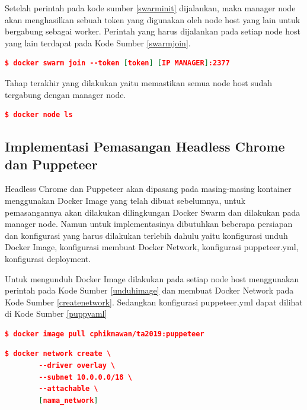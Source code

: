 			Setelah perintah pada kode sumber \ref{swarminit} dijalankan, maka manager node akan menghasilkan sebuah token yang digunakan oleh node host yang lain untuk bergabung sebagai worker. Perintah yang harus dijalankan pada setiap node host yang lain terdapat pada Kode Sumber \ref{swarmjoin}.
			\begin{lstlisting}[frame=single,tabsize=2,breaklines,caption={Perintah untuk bergabung ke Swarm},label=swarmjoin, captionpos=b, language=json,numbers=none]
	$ docker swarm join --token [token] [IP MANAGER]:2377
			\end{lstlisting}
			
			Tahap terakhir yang dilakukan yaitu memastikan semua node host sudah tergabung dengan manager node.
			\begin{lstlisting}[frame=single,tabsize=2,breaklines,caption={Perintah untuk melihat daftar Swarm Node},label=dockernodels, captionpos=b, language=json,numbers=none]
	$ docker node ls
			\end{lstlisting}
			
		\subsection{Implementasi Pemasangan Headless Chrome dan Puppeteer}
			Headless Chrome dan Puppeteer akan dipasang pada masing-masing kontainer menggunakan Docker Image yang telah dibuat sebelumnya, untuk pemasangannya akan dilakukan dilingkungan Docker Swarm dan dilakukan pada manager node. Namun untuk implementasinya dibutuhkan beberapa persiapan dan konfigurasi yang harus dilakukan terlebih dahulu yaitu konfigurasi unduh Docker Image, konfigurasi membuat Docker Network, konfigurasi puppeteer.yml, konfigurasi deployment.
			
			\indent Untuk mengunduh Docker Image dilakukan pada setiap node host menggunakan perintah pada Kode Sumber \ref{unduhimage} dan membuat Docker Network pada Kode Sumber \ref{createnetwork}. Sedangkan konfigurasi puppeteer.yml dapat dilihat di Kode Sumber \ref{puppyaml}
			\begin{lstlisting}[frame=single,tabsize=2,breaklines,caption={Perintah untuk mengunduh Docker Image },label=unduhimage, captionpos=b, language=json,numbers=none]
	$ docker image pull cphikmawan/ta2019:puppeteer
			\end{lstlisting}
			
			\begin{lstlisting}[frame=single,tabsize=2,breaklines,caption={Perintah untuk membuat Docker Network },label=createnetwork, captionpos=b, language=json,numbers=none]
	$ docker network create \
		--driver overlay \
		--subnet 10.0.0.0/18 \
		--attachable \
		[nama_network]
			\end{lstlisting}
			
